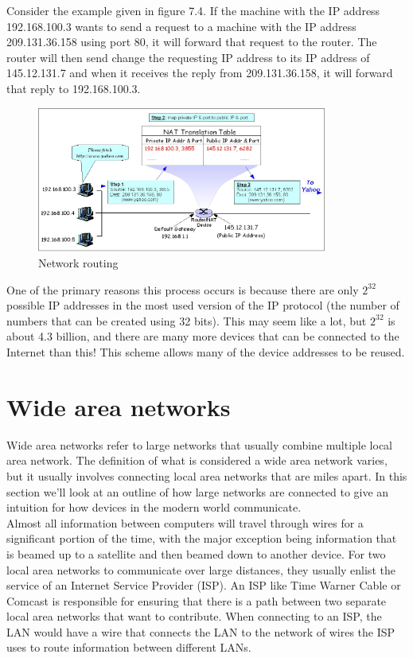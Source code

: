 Consider the example given in figure 7.4. If the machine with the IP address 192.168.100.3 wants to send a request to a machine with the IP address 209.131.36.158 using port 80, it will forward that request to the router. The router will then send change the requesting IP address to its IP address of 145.12.131.7 and when it receives the reply from 209.131.36.158, it will forward that reply to 192.168.100.3. \\

\begin{figure}
	\centering
	\includegraphics[width=0.85\textwidth]{lectures/images/routingExample.png}
	\caption{Network routing}
	\label{fig:windows:file}
\end{figure}


One of the primary reasons this process occurs is because there are only $2^{32}$ possible IP addresses in the most used version of the IP protocol (the number of numbers that can be created using 32 bits). This may seem like a lot, but $2^{32}$ is about 4.3 billion, and there are many more devices that can be connected to the Internet than this! This scheme allows many of the device addresses to be reused. \\

\section{Wide area networks}

Wide area networks refer to large networks that usually combine multiple local area network. The definition of what is considered a wide area network varies, but it usually involves connecting local area networks that are miles apart. In this section we’ll look at an outline of how large networks are connected to give an intuition for how devices in the modern world communicate. \\

Almost all information between computers will travel through wires for a significant portion of the time, with the major exception being information that is beamed up to a satellite and then beamed down to another device. For two local area networks to communicate over large distances, they usually enlist the service of an Internet Service Provider (ISP). An ISP like Time Warner Cable or Comcast is responsible for ensuring that there is a path between two separate local area networks that want to contribute. When connecting to an ISP, the LAN would have a wire that connects the LAN to the network of wires the ISP uses to route information between different LANs. \\

